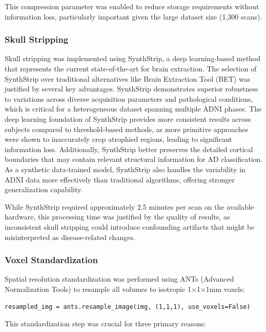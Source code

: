 \documentclass[12pt, a4paper]{article}
\begin{document}
This compression parameter was enabled to reduce storage requirements without information loss, particularly important given the large dataset size (1,300 scans).

\subsubsection{Skull Stripping}

Skull stripping was implemented using SynthStrip, a deep learning-based method that represents the current state-of-the-art for brain extraction. The selection of SynthStrip over traditional alternatives like Brain Extraction Tool (BET) was justified by several key advantages. SynthStrip demonstrates superior robustness to variations across diverse acquisition parameters and pathological conditions, which is critical for a heterogeneous dataset spanning multiple ADNI phases. The deep learning foundation of SynthStrip provides more consistent results across subjects compared to threshold-based methods, as more primitive approaches were shown to inaccurately crop atrophied regions, leading to significant information loss. Additionally, SynthStrip better preserves the detailed cortical boundaries that may contain relevant structural information for AD classification. As a synthetic data-trained model, SynthStrip also handles the variability in ADNI data more effectively than traditional algorithms, offering stronger generalization capability.

While SynthStrip required approximately 2.5 minutes per scan on the available hardware, this processing time was justified by the quality of results, as inconsistent skull stripping could introduce confounding artifacts that might be misinterpreted as disease-related changes.

\subsubsection{Voxel Standardization}

Spatial resolution standardization was performed using ANTs (Advanced Normalization Tools) to resample all volumes to isotropic 1$\times$1$\times$1mm voxels:

\begin{verbatim}
resampled_img = ants.resample_image(img, (1,1,1), use_voxels=False)
\end{verbatim}

This standardization step was crucial for three primary reasons:
\end{document}
